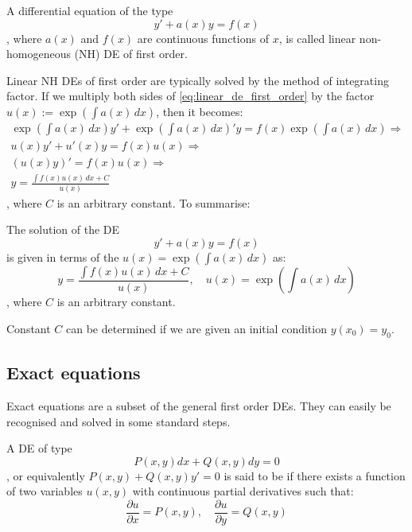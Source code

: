 \documentclass[a4paper]{article}
\begin{document}
\begin{definition} A differential equation of the type
    \begin{equation}
        y' + a(x)y = f(x)
        \label{eq:linear_de_first_order}
    \end{equation}
    , where $a(x)$ and $f(x)$ are continuous functions of $x$, is called linear non-homogeneous (NH) DE of first order. 
\end{definition}
Linear NH DEs of first order are typically solved by the method of integrating factor. If we multiply both sides of \eqref{eq:linear_de_first_order} by the factor $u(x) := \exp\left(\int a(x)\, dx\right)$, then it becomes:
\begin{gather*}
        \exp\left(\int a(x)\, dx\right)y' + \exp\left(\int a(x)\, dx\right)'y = f(x)\exp\left(\int a(x)\, dx\right) \Rightarrow \\
        u(x)y' + u'(x)y = f(x)u(x) \Rightarrow \\
        (u(x)y)' = f(x)u(x)  \Rightarrow \\
        y = \frac{\int f(x)u(x)\, dx + C}{u(x)} 
\end{gather*}
, where $C$ is an arbitrary constant. To summarise:
\begin{corollary}
    The solution of the DE
    \begin{equation}
        y' + a(x)y = f(x)
        \label{eq:nonhomo_first_order}
    \end{equation}
    is given in terms of the  $u(x) =  \exp\left(\int a(x)\, dx\right)$ as:
    \begin{equation}
        y = \frac{\int f(x)u(x)\, dx + C}{u(x)} , \quad  u(x) =  \exp\left(\int a(x)\, dx\right)
        \label{eq:ide_nh_first_order_intergrating_factor}
    \end{equation}
    , where $C$ is an arbitrary constant.
\end{corollary}
Constant $C$ can be determined if we are given an initial condition $y(x_0) = y_0$.


\subsection{Exact equations}
Exact equations are a subset of the general first order DEs. They can easily be recognised and solved in some standard steps.
\begin{definition}[exact DE]
A DE of type 
\begin{equation}
    P(x,y)dx + Q(x,y)dy = 0
    \label{eq:de_p_q}
\end{equation}
    , or equivalently $P(x,y) + Q(x,y)y' = 0$ is said to be  if there exists a function of two variables $u(x,y)$ with continuous partial derivatives such that:
    \begin{equation}
        \frac{\partial u}{\partial x} = P(x,y), \quad \frac{\partial u}{\partial y} = Q(x,y)
        \label{eq:de_exact_u}
    \end{equation}
\end{definition}
\end{document}

